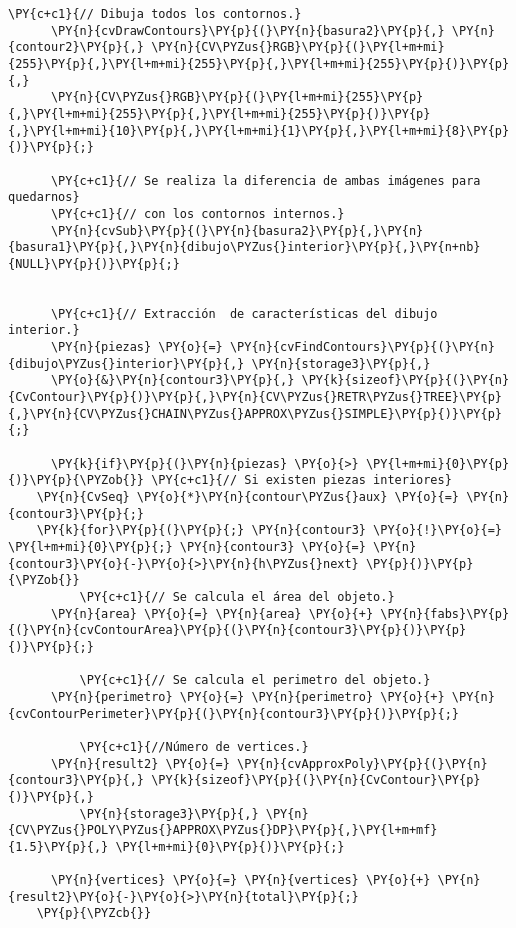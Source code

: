 \begin{Verbatim}[commandchars=\\\{\}]
      \PY{c+c1}{// Dibuja todos los contornos.}
      \PY{n}{cvDrawContours}\PY{p}{(}\PY{n}{basura2}\PY{p}{,} \PY{n}{contour2}\PY{p}{,} \PY{n}{CV\PYZus{}RGB}\PY{p}{(}\PY{l+m+mi}{255}\PY{p}{,}\PY{l+m+mi}{255}\PY{p}{,}\PY{l+m+mi}{255}\PY{p}{)}\PY{p}{,} 
      \PY{n}{CV\PYZus{}RGB}\PY{p}{(}\PY{l+m+mi}{255}\PY{p}{,}\PY{l+m+mi}{255}\PY{p}{,}\PY{l+m+mi}{255}\PY{p}{)}\PY{p}{,}\PY{l+m+mi}{10}\PY{p}{,}\PY{l+m+mi}{1}\PY{p}{,}\PY{l+m+mi}{8}\PY{p}{)}\PY{p}{;} 
      
      \PY{c+c1}{// Se realiza la diferencia de ambas imágenes para quedarnos}
      \PY{c+c1}{// con los contornos internos.}
      \PY{n}{cvSub}\PY{p}{(}\PY{n}{basura2}\PY{p}{,}\PY{n}{basura1}\PY{p}{,}\PY{n}{dibujo\PYZus{}interior}\PY{p}{,}\PY{n+nb}{NULL}\PY{p}{)}\PY{p}{;}
      
      
      \PY{c+c1}{// Extracción  de características del dibujo interior.}
      \PY{n}{piezas} \PY{o}{=} \PY{n}{cvFindContours}\PY{p}{(}\PY{n}{dibujo\PYZus{}interior}\PY{p}{,} \PY{n}{storage3}\PY{p}{,}
      \PY{o}{&}\PY{n}{contour3}\PY{p}{,} \PY{k}{sizeof}\PY{p}{(}\PY{n}{CvContour}\PY{p}{)}\PY{p}{,}\PY{n}{CV\PYZus{}RETR\PYZus{}TREE}\PY{p}{,}\PY{n}{CV\PYZus{}CHAIN\PYZus{}APPROX\PYZus{}SIMPLE}\PY{p}{)}\PY{p}{;}
      
      \PY{k}{if}\PY{p}{(}\PY{n}{piezas} \PY{o}{>} \PY{l+m+mi}{0}\PY{p}{)}\PY{p}{\PYZob{}} \PY{c+c1}{// Si existen piezas interiores}
	\PY{n}{CvSeq} \PY{o}{*}\PY{n}{contour\PYZus{}aux} \PY{o}{=} \PY{n}{contour3}\PY{p}{;}
	\PY{k}{for}\PY{p}{(}\PY{p}{;} \PY{n}{contour3} \PY{o}{!}\PY{o}{=} \PY{l+m+mi}{0}\PY{p}{;} \PY{n}{contour3} \PY{o}{=} \PY{n}{contour3}\PY{o}{-}\PY{o}{>}\PY{n}{h\PYZus{}next} \PY{p}{)}\PY{p}{\PYZob{}} 
          \PY{c+c1}{// Se calcula el área del objeto.}
	  \PY{n}{area} \PY{o}{=} \PY{n}{area} \PY{o}{+} \PY{n}{fabs}\PY{p}{(}\PY{n}{cvContourArea}\PY{p}{(}\PY{n}{contour3}\PY{p}{)}\PY{p}{)}\PY{p}{;} 
         
          \PY{c+c1}{// Se calcula el perimetro del objeto.}
	  \PY{n}{perimetro} \PY{o}{=} \PY{n}{perimetro} \PY{o}{+} \PY{n}{cvContourPerimeter}\PY{p}{(}\PY{n}{contour3}\PY{p}{)}\PY{p}{;}
 
          \PY{c+c1}{//Número de vertices.}
	  \PY{n}{result2} \PY{o}{=} \PY{n}{cvApproxPoly}\PY{p}{(}\PY{n}{contour3}\PY{p}{,} \PY{k}{sizeof}\PY{p}{(}\PY{n}{CvContour}\PY{p}{)}\PY{p}{,} 
          \PY{n}{storage3}\PY{p}{,} \PY{n}{CV\PYZus{}POLY\PYZus{}APPROX\PYZus{}DP}\PY{p}{,}\PY{l+m+mf}{1.5}\PY{p}{,} \PY{l+m+mi}{0}\PY{p}{)}\PY{p}{;}

	  \PY{n}{vertices} \PY{o}{=} \PY{n}{vertices} \PY{o}{+} \PY{n}{result2}\PY{o}{-}\PY{o}{>}\PY{n}{total}\PY{p}{;}                 
	\PY{p}{\PYZcb{}}
	

\end{Verbatim}
